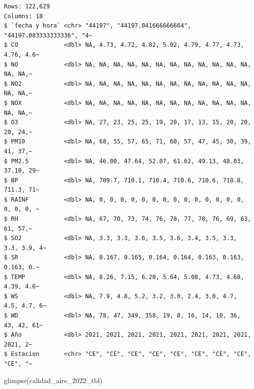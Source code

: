 \documentclass[
  letterpaper,
  DIV=11,
  numbers=noendperiod]{scrartcl}
\newenvironment{Shaded}{\begin{snugshade}}{\end{snugshade}}
\newcommand{\FunctionTok}[1]{\textcolor[rgb]{0.28,0.35,0.67}{#1}}
\newcommand{\NormalTok}[1]{\textcolor[rgb]{0.00,0.23,0.31}{#1}}
\begin{document}
\begin{verbatim}
Rows: 122,629
Columns: 18
$ `fecha y hora` <chr> "44197", "44197.041666666664", "44197.083333333336", "4~
$ CO             <dbl> NA, 4.73, 4.72, 4.82, 5.02, 4.79, 4.77, 4.73, 4.76, 4.6~
$ NO             <dbl> NA, NA, NA, NA, NA, NA, NA, NA, NA, NA, NA, NA, NA, NA,~
$ NO2            <dbl> NA, NA, NA, NA, NA, NA, NA, NA, NA, NA, NA, NA, NA, NA,~
$ NOX            <dbl> NA, NA, NA, NA, NA, NA, NA, NA, NA, NA, NA, NA, NA, NA,~
$ O3             <dbl> NA, 27, 23, 25, 25, 19, 20, 17, 13, 15, 20, 20, 20, 24,~
$ PM10           <dbl> NA, 68, 55, 57, 65, 71, 60, 57, 47, 45, 30, 39, 41, 37,~
$ PM2.5          <dbl> NA, 46.00, 47.64, 52.07, 61.62, 49.13, 48.03, 37.10, 29~
$ BP             <dbl> NA, 709.7, 710.1, 710.4, 710.6, 710.6, 710.8, 711.3, 71~
$ RAINF          <dbl> NA, 0, 0, 0, 0, 0, 0, 0, 0, 0, 0, 0, 0, 0, 0, 0, 0, 0, ~
$ RH             <dbl> NA, 67, 70, 73, 74, 76, 78, 77, 78, 76, 69, 63, 61, 57,~
$ SO2            <dbl> NA, 3.3, 3.3, 3.6, 3.5, 3.6, 3.4, 3.5, 3.3, 3.3, 3.9, 4~
$ SR             <dbl> NA, 0.167, 0.165, 0.164, 0.164, 0.163, 0.163, 0.163, 0.~
$ TEMP           <dbl> NA, 8.26, 7.15, 6.20, 5.64, 5.08, 4.73, 4.68, 4.39, 4.6~
$ WS             <dbl> NA, 7.9, 4.8, 5.2, 3.2, 3.0, 2.4, 3.0, 4.7, 4.5, 4.7, 6~
$ WD             <dbl> NA, 78, 47, 349, 358, 19, 8, 16, 14, 10, 36, 43, 42, 61~
$ Año            <dbl> 2021, 2021, 2021, 2021, 2021, 2021, 2021, 2021, 2021, 2~
$ Estacion       <chr> "CE", "CE", "CE", "CE", "CE", "CE", "CE", "CE", "CE", "~
\end{verbatim}

\begin{Shaded}
\begin{Highlighting}[]
\FunctionTok{glimpse}\NormalTok{(calidad\_aire\_2022\_tbl)}
\end{Highlighting}
\end{Shaded}
\end{document}
